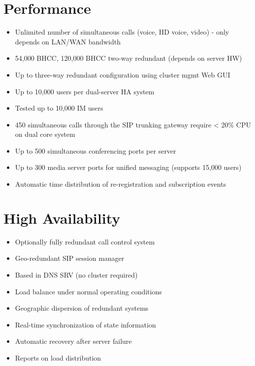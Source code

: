 \documentclass[letterpaper,10pt,english]{sphinxmanual}
\begin{document}
\section{Performance}
\label{\detokenize{features:performance}}\begin{itemize}
\item {} 
Unlimited number of simultaneous calls (voice, HD voice, video) - only depends on LAN/WAN bandwidth

\item {} 
54,000 BHCC, 120,000 BHCC two-way redundant (depends on server HW)

\item {} 
Up to three-way redundant configuration using cluster mgmt Web GUI

\item {} 
Up to 10,000 users per dual-server HA system

\item {} 
Tested up to 10,000 IM users

\item {} 
450 simultaneous calls through the SIP trunking gateway require \textless{} 20\% CPU on dual core system

\item {} 
Up to 500 simultaneous conferencing ports per server

\item {} 
Up to 300 media server ports for unified messaging (supports 15,000 users)

\item {} 
Automatic time distribution of re-registration and subscription events

\end{itemize}


\section{High Availability}
\label{\detokenize{features:high-availability}}\begin{itemize}
\item {} 
Optionally fully redundant call control system

\item {} 
Geo-redundant SIP session manager

\item {} 
Based in DNS SRV (no cluster required)

\item {} 
Load balance under normal operating conditions

\item {} 
Geographic dispersion of redundant systems

\item {} 
Real-time synchronization of state information

\item {} 
Automatic recovery after server failure

\item {} 
Reports on load distribution

\end{itemize}
\end{document}
